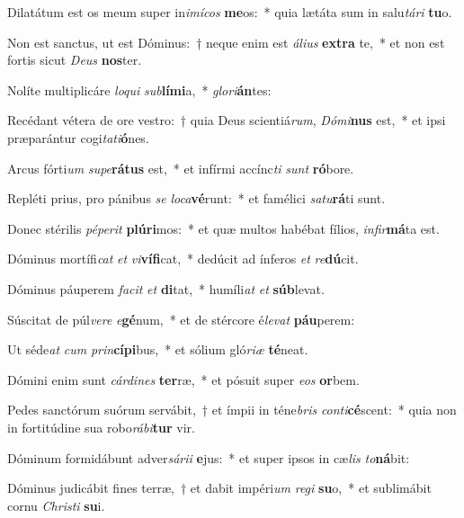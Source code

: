 \item Dilatátum est os meum super in\textit{i}\textit{mí}\textit{cos} \textbf{me}os:~* quia lætáta sum in salu\textit{tá}\textit{ri} \textbf{tu}o.
\item Non est sanctus, ut est Dóminus:~† neque enim est \textit{á}\textit{li}\textit{us} \textbf{ex}\textbf{tra} te,~* et non est fortis sicut \textit{De}\textit{us} \textbf{nos}ter.
\item Nolíte multiplicáre \textit{lo}\textit{qui} \textit{sub}\textbf{lí}\textbf{mi}a,~* \textit{glo}\textit{ri}\textbf{án}tes:
\item Recédant vétera de ore vestro:~† quia Deus scientiá\textit{rum}, \textit{Dó}\textit{mi}\textbf{nus} est,~* et ipsi præparántur cogi\textit{ta}\textit{ti}\textbf{ó}nes.
\item Arcus fórti\textit{um} \textit{su}\textit{pe}\textbf{rá}\textbf{tus} est,~* et infírmi accínc\textit{ti} \textit{sunt} \textbf{ró}bore.
\item Repléti prius, pro pánibus \textit{se} \textit{lo}\textit{ca}\textbf{vé}runt:~* et famélici \textit{sa}\textit{tu}\textbf{rá}ti sunt.
\item Donec stérilis \textit{pé}\textit{pe}\textit{rit} \textbf{plú}\textbf{ri}mos:~* et quæ multos habébat fílios, \textit{in}\textit{fir}\textbf{má}ta est.
\item Dóminus mortífi\textit{cat} \textit{et} \textit{vi}\textbf{ví}\textbf{fi}cat,~* dedúcit ad ínferos \textit{et} \textit{re}\textbf{dú}cit.
\item Dóminus páuperem \textit{fa}\textit{cit} \textit{et} \textbf{di}tat,~* humíli\textit{at} \textit{et} \textbf{súb}levat.
\item Súscitat de púl\textit{ve}\textit{re} \textit{e}\textbf{gé}num,~* et de stércore é\textit{le}\textit{vat} \textbf{páu}perem:
\item Ut séde\textit{at} \textit{cum} \textit{prin}\textbf{cí}\textbf{pi}bus,~* et sólium gló\textit{ri}\textit{æ} \textbf{té}neat.
\item Dómini enim sunt \textit{cár}\textit{di}\textit{nes} \textbf{ter}ræ,~* et pósuit super \textit{e}\textit{os} \textbf{or}bem.
\item Pedes sanctórum suórum servábit,~† et ímpii in téne\textit{bris} \textit{con}\textit{ti}\textbf{cé}scent:~* quia non in fortitúdine sua robo\textit{rá}\textit{bi}\textbf{tur} vir.
\item Dóminum formidábunt adver\textit{sá}\textit{ri}\textit{i} \textbf{e}jus:~* et super ipsos in cæ\textit{lis} \textit{to}\textbf{ná}bit:
\item Dóminus judicábit fines terræ,~† et dabit impéri\textit{um} \textit{re}\textit{gi} \textbf{su}o,~* et sublimábit cornu \textit{Chris}\textit{ti} \textbf{su}i.
